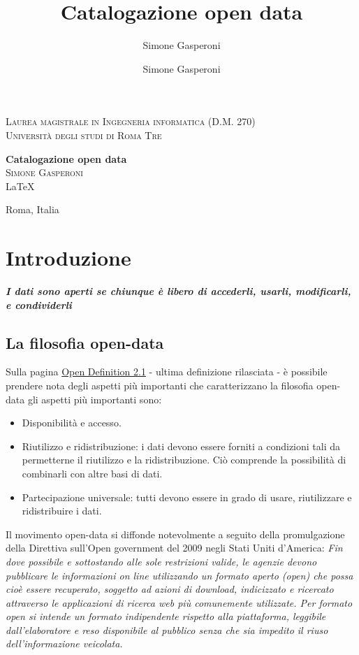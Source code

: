 \documentclass{article}
\author{Simone Gasperoni}
\author{Simone Gasperoni}
\title{Catalogazione open data}
\theoremstyle{plain}
\theoremstyle{definition}
\begin{document}
\begin{titlepage}
\begin{center}

\textsc{Laurea magistrale in Ingegneria informatica (D.M. 270)}\\[0.5cm]
\textsc{Università degli studi di Roma Tre}\\[0.5cm]

\hrulefill

{ \huge \bfseries Catalogazione open data \\[0.4cm] }
\textsc{\Large Simone Gasperoni}\\[0.5cm]
\vfill
\LaTeX


Roma, Italia
\end{center}
\end{titlepage}


\tableofcontents

\newpage
\section{Introduzione}
\textbf{\textit{I dati sono aperti se chiunque è libero di accederli, usarli, modificarli, e condividerli}}

\subsection{La filosofia open-data}

Sulla pagina \href{http://opendefinition.org/od/2.1/en}{Open Definition 2.1}\footnotemark
{}
 - ultima definizione rilasciata - è possibile prendere nota degli aspetti più importanti che caratterizzano la filosofia open-data gli aspetti più importanti sono:
\begin{itemize}
\item Disponibilità e accesso.
\item Riutilizzo e ridistribuzione: i dati devono essere forniti a condizioni tali da permetterne il riutilizzo e la ridistribuzione. Ciò comprende la possibilità di combinarli con altre basi di dati.
\item Partecipazione universale: tutti devono essere in grado di usare, riutilizzare e ridistribuire i dati.
\end{itemize}

Il movimento open-data si diffonde notevolmente a seguito della promulgazione della Direttiva sull'Open government del 2009 negli Stati Uniti d'America:
\textit{Fin dove possibile e sottostando alle sole restrizioni valide, le agenzie devono pubblicare le informazioni on line utilizzando un formato aperto (open) che possa cioè essere recuperato, soggetto ad azioni di download, indicizzato e ricercato attraverso le applicazioni di ricerca web più comunemente utilizzate. Per formato open si intende un formato indipendente rispetto alla piattaforma, leggibile dall'elaboratore e reso disponibile al pubblico senza che sia impedito il riuso dell'informazione veicolata.}
\end{document}
